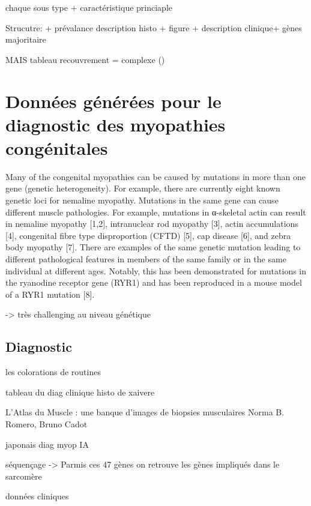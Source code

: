 chaque sous type + caractéristique princiaple

Strucutre: + prévalance description histo + figure + description clinique+ gènes majoritaire 

MAIS tableau recouvrement = complexe (\cite{jungbluth_congenital_2018})

\section{Données générées pour le diagnostic des myopathies congénitales}
Many of the congenital myopathies can be caused by mutations in more than one gene (genetic heterogeneity). For example, there are currently eight known genetic loci for nemaline myopathy.
Mutations in the same gene can cause different muscle pathologies. For example, mutations in α-skeletal actin can result in nemaline myopathy [1,2], intranuclear rod myopathy [3], actin accumulations [4], congenital fibre type disproportion (CFTD) [5], cap disease [6], and zebra body myopathy [7].
There are examples of the same genetic mutation leading to different pathological features in members of the same family or in the same individual at different ages. Notably, this has been demonstrated for mutations in the ryanodine receptor gene (RYR1) and has been reproduced in a mouse model of a RYR1 mutation [8].

-> très challenging au niveau génétique 

\subsection{Diagnostic}
les colorations de routines

tableau du diag clinique histo de xaivere

L’Atlas du Muscle : une banque d’images
de biopsies musculaires
Norma B. Romero, Bruno Cadot

japonais diag myop IA

séquençage -> Parmis ces 47 gènes on retrouve les gènes impliqués dans le sarcomère

données cliniques